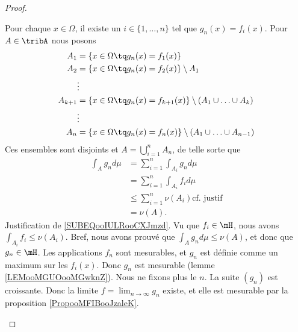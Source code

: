 \begin{proof}
\begin{subproof}
		Pour chaque \( x\in\Omega\), il existe un \( i\in\{ 1,\ldots,n \}\) tel que \( g_n(x)=f_i(x)\). Pour \( A\in \tribA\) nous posons
		\begin{subequations}
			\begin{align}
				A_1     & =\{ x\in\Omega\tq g_n(x)=f_1(x) \}                                       \\
				A_2     & =\{ x\in\Omega\tq g_n(x)=f_2(x) \}\setminus A_1                          \\
				        & \vdots                                                                   \\
				A_{k+1} & =\{ x\in\Omega\tq g_n(x)=f_{k+1}(x) \}\setminus (A_1\cup\ldots \cup A_k) \\
				        & \vdots                                                                   \\
				A_n     & =\{ x\in\Omega\tq g_n(x)=f_n(x) \}\setminus (A_1\cup\ldots \cup A_{n-1})
			\end{align}
		\end{subequations}
		Ces ensembles sont disjoints et \( A=\bigcup_{i=1}^nA_n\), de telle sorte que
		\begin{subequations}
			\begin{align}
				\int_Ag_nd\mu & =\sum_{i=1}^n\int_{A_i}g_nd\mu                                           \\
				              & =\sum_{i=1}^n\int_{A_i}f_id\mu                                           \\
				              & \leq \sum_{i=1}^n\nu(A_i)   \text{cf. justif}		\label{SUBEQooIULRooCXJmzd} \\
				              & =\nu(A).
			\end{align}
		\end{subequations}
		Justification de \eqref{SUBEQooIULRooCXJmzd}. Vu que \( f_i\in \mH\), nous avons \( \int_{A_i}f_i\leq \nu(A_i)\). Bref, nous avons prouvé que \( \int_Ag_nd\mu\leq \nu(A)\), et donc que \( g_n\in \mH\).
		Les applications \( f_n\) sont mesurables, et \( g_n\) est définie comme un maximum sur les \( f_i(x)\). Donc \( g_n\) est mesurable (lemme \ref{LEMooMGUOooMGwknZ}).
		Nous ne fixons plus le \( n\). La suite \( (g_n)\) est croissante. Donc la limite \( f=\lim_{n\to\infty}g_n\) existe, et elle est mesurable par la proposition \ref{PropooMFIBooJzaleK}.

		\spitem[\( \int_{\alpha}fd\mu=\alpha\)]		\label{SPITEMooGLPCooBjBAdm}


\end{subproof}
\end{proof}
